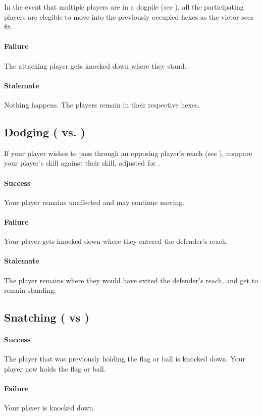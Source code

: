 \begin{note}
In the event that multiple players are in a dogpile (see ), all the participating players are elegible to move into the previously occupied hexes as the victor sees fit.
\end{note}
\paragraph{Failure}
The attacking player gets knocked down where they stand.
\paragraph{Stalemate}
Nothing happens.
The players remain in their respective hexes.

\subsection{Dodging (\flight{} vs. \fight{})}
If your player wishes to pass through an opposing player's reach (see ), compare your player's \flight{} skill against their \fight{} skill, adjusted for \fate{}.

\paragraph{Success}
Your player remains unaffected and may continue moving.
\paragraph{Failure}
Your player gets knocked down where they entered the defender's reach.
\paragraph{Stalemate}
The player remains where they would have exited the defender's reach, and get to remain standing.

\subsection{Snatching (\flight{} vs \flight{})}
\paragraph{Success}
The player that was previously holding the flag or ball is knocked down.
Your player now holds the flag or ball.
\paragraph{Failure}
Your player is knocked down.
